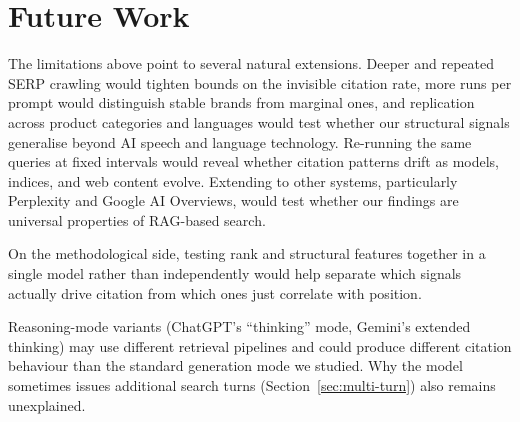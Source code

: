 \section{Future Work}
\label{sec:future-work}
\label{sec:fw-replication}
\label{sec:fw-methodology}
\label{sec:fw-search-trigger}
\label{sec:fw-user-study}

The limitations above point to several natural extensions. Deeper and repeated SERP crawling would tighten bounds on the invisible citation rate, more runs per prompt would distinguish stable brands from marginal ones, and replication across product categories and languages would test whether our structural signals generalise beyond AI speech and language technology. Re-running the same queries at fixed intervals would reveal whether citation patterns drift as models, indices, and web content evolve. Extending to other systems, particularly Perplexity \parencite{ahrefs2026chatgptvsgoogle} and Google AI Overviews, would test whether our findings are universal properties of RAG-based search.

On the methodological side, testing rank and structural features together in a single model rather than independently would help separate which signals actually drive citation from which ones just correlate with position.

Reasoning-mode variants (ChatGPT's ``thinking'' mode, Gemini's extended thinking) may use different retrieval pipelines and could produce different citation behaviour than the standard generation mode we studied. Why the model sometimes issues additional search turns (Section~\ref{sec:multi-turn}) also remains unexplained.